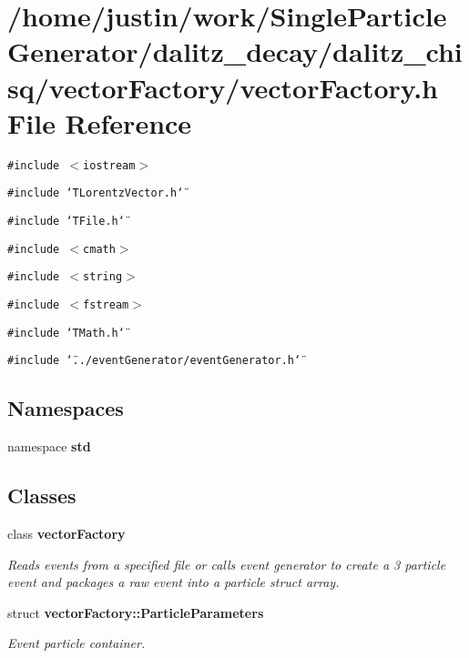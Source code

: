 \section{/home/justin/work/Single\-Particle\-Generator/dalitz\_\-decay/dalitz\_\-chisq/vector\-Factory/vector\-Factory.h File Reference}
\label{vectorFactory_8h}
{\tt \#include $<$iostream$>$}\par
{\tt \#include \char`\"{}TLorentz\-Vector.h\char`\"{}}\par
{\tt \#include \char`\"{}TFile.h\char`\"{}}\par
{\tt \#include $<$cmath$>$}\par
{\tt \#include $<$string$>$}\par
{\tt \#include $<$fstream$>$}\par
{\tt \#include \char`\"{}TMath.h\char`\"{}}\par
{\tt \#include \char`\"{}../event\-Generator/event\-Generator.h\char`\"{}}\par
\subsection*{Namespaces}
\begin{CompactItemize}
\item 
namespace \bf{std}
\end{CompactItemize}
\subsection*{Classes}
\begin{CompactItemize}
\item 
class \bf{vector\-Factory}
\begin{CompactList}\small\item\em Reads events from a specified file or calls event generator to create a 3 particle event and packages a raw event into a particle struct array. \item\end{CompactList}\item 
struct \bf{vector\-Factory::Particle\-Parameters}
\begin{CompactList}\small\item\em Event particle container. \item\end{CompactList}\end{CompactItemize}
